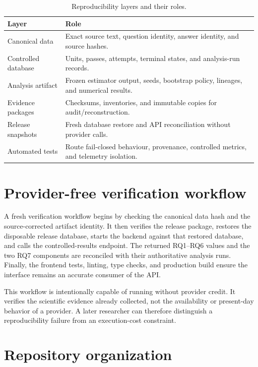 \begin{table}[H]
\centering
\caption{Reproducibility layers and their roles.}
\label{tab:repro-layers}
\begin{tabularx}{\textwidth}{@{}p{}X@{}}
\toprule
Layer & Role \\
\midrule
Canonical data & Exact source text, question identity, answer identity, and source hashes.\\
Controlled database & Units, passes, attempts, terminal states, and analysis-run records.\\
Analysis artifact & Frozen estimator output, seeds, bootstrap policy, lineages, and numerical results.\\
Evidence packages & Checksums, inventories, and immutable copies for audit/reconstruction.\\
Release snapshots & Fresh database restore and API reconciliation without provider calls.\\
Automated tests & Route fail-closed behaviour, provenance, controlled metrics, and telemetry isolation.\\
\bottomrule
\end{tabularx}
\end{table}

\section{Provider-free verification workflow}

A fresh verification workflow begins by checking the canonical data hash and the source-corrected artifact identity. It then verifies the release package, restores the disposable release database, starts the backend against that restored database, and calls the controlled-results endpoint. The returned RQ1--RQ6 values and the two RQ7 components are reconciled with their authoritative analysis runs. Finally, the frontend tests, linting, type checks, and production build ensure the interface remains an accurate consumer of the API.

This workflow is intentionally capable of running without provider credit. It verifies the scientific evidence already collected, not the availability or present-day behavior of a provider. A later researcher can therefore distinguish a reproducibility failure from an execution-cost constraint.

\section{Repository organization}

